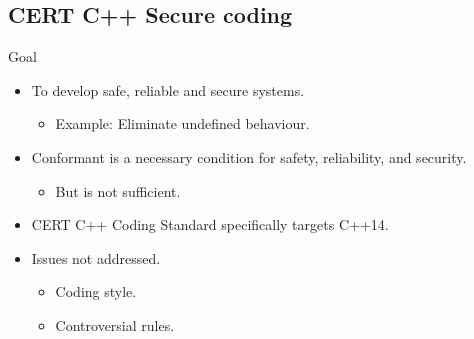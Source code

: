 \subsection{CERT C++ Secure coding}

\begin{frame}[t]{Goal}
\begin{itemize}
  \item To develop safe, reliable and secure systems.
    \begin{itemize}
      \item Example: Eliminate undefined behaviour.
    \end{itemize}

  \vfill
  \item Conformant is a necessary condition for safety, reliability, and security.
    \begin{itemize}
      \item But is not sufficient.
    \end{itemize}

  \vfill
  \item CERT C++ Coding Standard specifically targets C++14.

  \vfill
  \item Issues not addressed.
    \begin{itemize}
      \item Coding style.
      \item Controversial rules.
    \end{itemize}
\end{itemize}
\end{frame}

